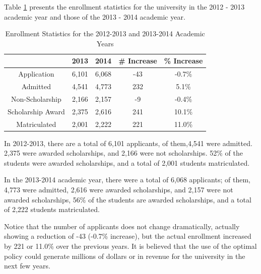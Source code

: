 \documentclass[12pt,english]{report}
\begin{document}
Table \ref{enroll_stats} presents the enrollment statistics for the university
in the 2012 - 2013 academic year and those of the 2013 - 2014 academic year.

\begin{table}[ht!]
\centering
\begin{tabular}{|c|c|c|c|c|}
\hline
& 2013 & 2014 & \# Increase & \% Increase \\ \hline
Application                    & 6,101 & 6,068 & -43         & -0.7\%      \\
\hline
Admitted                       & 4,541 & 4,773 & 232         & 5.1\%       \\
\hline
Non-Scholarship                & 2,166 & 2,157 & -9          & -0.4\%      \\
\hline
Scholarship Award              & 2,375 & 2,616 & 241         & 10.1\%      \\
\hline
Matriculated                   & 2,001 & 2,222 & 221         & 11.0\%      \\
\hline
\end{tabular}
\caption{Enrollment Statistics for the 2012-2013 and 2013-2014 Academic Years}
\label{enroll_stats}

\end{table}

In 2012-2013, there are a total of 6,101 applicants, of them,4,541   were
admitted. 
2,375 were awarded scholarships, and 2,166 were not scholarships. 52\% of the
students
were awarded scholarships, and a total of 2,001 students matriculated.

In the 2013-2014 academic year, there were a total of 6,068 applicants; of
them, 4,773
were admitted, 2,616 were awarded scholarships, and 2,157 were not awarded
scholarships,
56\% of the students are awarded scholarships, and a total of 2,222 students
matriculated.

Notice that the number of applicants does not change dramatically, actually
showing a
reduction of -43 (-0.7\% increase), but the actual enrollment increased by 221 
or 
11.0\% over the previous years.  It is believed
 that the use of the optimal policy could generate millions of dollars or in
revenue
 for the university in the next few years.
\end{document}
